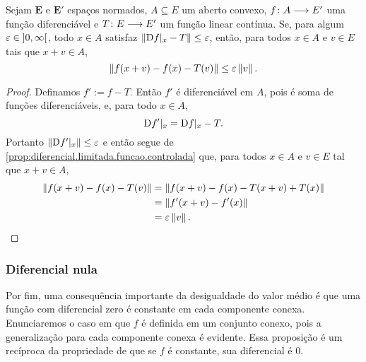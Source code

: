 \begin{proposition}
\label{prop:diferencial.limitada.funcao.controlada.corolario}
Sejam $\bm E$ e $\bm E'$ espaços normados, $A \subseteq E$ um aberto convexo, $f\colon \allowbreak A \longrightarrow E'$ uma função diferenciável e $T\colon \allowbreak E \longrightarrow E'$ um função linear contínua. Se, para algum $\varepsilon \in \left]0,\allowbreak \infty\right[$, todo $x \in A$ satisfaz $\left\Vert{\mathrm{D}f|_x - T}\right\Vert \leq \varepsilon$, então, para todos $x \in A$ e $v \in E$ tais que $x+v \in A$,
	\begin{equation*}
	\left\Vert{f(x+v) - f(x) - T(v)}\right\Vert \leq \varepsilon \left\Vert{v}\right\Vert.
	\end{equation*}
\end{proposition}
\begin{proof}
Definamos $f' := f - T$. Então $f'$ é diferenciável em $A$, pois é soma de funções diferenciáveis, e, para todo $x \in A$,
	\begin{equation*}
	\mathrm{D} f'|_x = \mathrm{D} f|_x - T.
	\end{equation*}
Portanto $\left\Vert{\mathrm{D}f'|_x}\right\Vert \leq \varepsilon$ e então segue de \ref{prop:diferencial.limitada.funcao.controlada} que, para todos $x \in A$ e $v \in E$ tal que $x+v \in A$,
	\begin{align*}
	\left\Vert{f(x+v) - f(x) - T(v)}\right\Vert &= \left\Vert{f(x+v) - f(x) - T(x+v) + T(x)}\right\Vert \\
		&= \left\Vert{f'(x+v) - f'(x)}\right\Vert \\
		&= \varepsilon \left\Vert{v}\right\Vert.
	\qedhere
	\end{align*}
\end{proof}

\subsubsection{Diferencial nula}

Por fim, uma consequência importante da desigualdade do valor médio é que uma função com diferencial zero é constante em cada componente conexa. Enunciaremos o caso em que $f$ é definida em um conjunto conexo, pois a generalização para cada componente conexa é evidente. Essa proposição é um recíproca da propriedade de que se $f$ é constante, sua diferencial é $0$.

